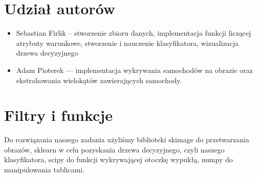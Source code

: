 \documentclass{article}
\begin{document}


\section*{Udział autorów}
\begin{itemize}
\item Sebastian Firlik -- stworzenie zbioru danych, implementacja funkcji liczącej atrybuty warunkowe, stworzenie i nauczenie klasyfikatora, wizualizacja drzewa decyzyjnego
\item Adam Pioterek — implementacja wykrywania samochodów na obrazie oraz ekstrahowania wielokątów zawierających samochody.
\end{itemize}

\section{Filtry i funkcje}
Do rozwiązania naszego zadania użyliśmy biblioteki skimage do przetwarzania obrazów, sklearn w celu pozyskania drzewa decyzyjnego, czyli naszego klasyfikatora, scipy do funkcji wykrywającej otoczkę wypukłą, numpy do manipulowania tablicami.
\end{document}
